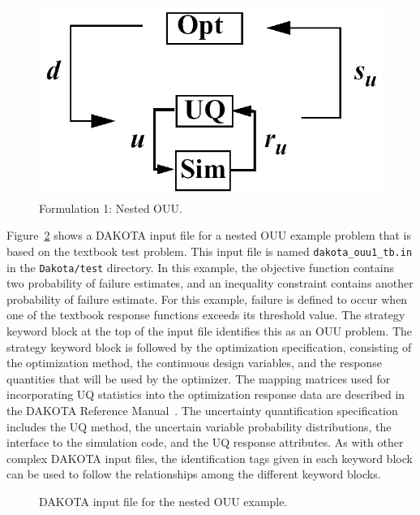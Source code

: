 \begin{figure}
  \centering
  \includegraphics[scale=0.33]{images/nested_ouu}
  \caption{Formulation 1: Nested OUU.}
  \label{models:ex:figure08}
\end{figure}

Figure~\ref{models:ex:figure09} shows a DAKOTA input file for a nested
OUU example problem that is based on the textbook test problem. This
input file is named \texttt{dakota\_ouu1\_tb.in} in the
\texttt{Dakota/test} directory.  In this example, the objective
function contains two probability of failure estimates, and an
inequality constraint contains another probability of failure
estimate. For this example, failure is defined to occur when one of
the textbook response functions exceeds its threshold value. The
strategy keyword block at the top of the input file identifies this as
an OUU problem. The strategy keyword block is followed by the
optimization specification, consisting of the optimization method, the
continuous design variables, and the response quantities that will be
used by the optimizer. The mapping matrices used for incorporating UQ
statistics into the optimization response data are described in the
DAKOTA Reference Manual~\cite{RefMan}. The uncertainty quantification
specification includes the UQ method, the uncertain variable
probability distributions, the interface to the simulation code, and
the UQ response attributes. As with other complex DAKOTA input files,
the identification tags given in each keyword block can be used to
follow the relationships among the different keyword blocks.

\begin{figure}
  \centering
  \begin{bigbox}
    \begin{tiny}
    \end{tiny}
  \end{bigbox}
  \caption{DAKOTA input file for the nested OUU example.}
  \label{models:ex:figure09}
\end{figure}

